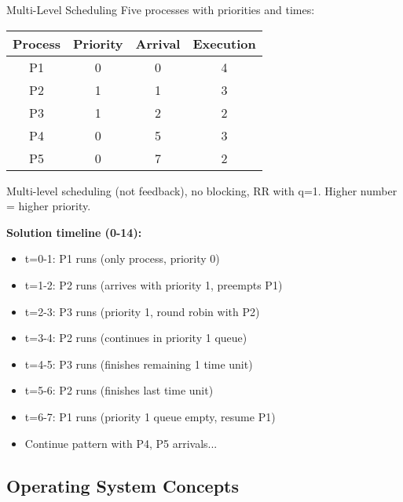 \begin{example2}{Multi-Level Scheduling}
    Five processes with priorities and times:
    
    \begin{tabular}{|c|c|c|c|}
        \hline
        Process & Priority & Arrival & Execution \\
        \hline
        P1 & 0 & 0 & 4 \\
        P2 & 1 & 1 & 3 \\
        P3 & 1 & 2 & 2 \\
        P4 & 0 & 5 & 3 \\
        P5 & 0 & 7 & 2 \\
        \hline
    \end{tabular}
    
    Multi-level scheduling (not feedback), no blocking, RR with q=1.
    Higher number = higher priority.
    
    \tcblower
    
    \textbf{Solution timeline (0-14):}
    \begin{itemize}
        \item t=0-1: P1 runs (only process, priority 0)
        \item t=1-2: P2 runs (arrives with priority 1, preempts P1)
        \item t=2-3: P3 runs (priority 1, round robin with P2)
        \item t=3-4: P2 runs (continues in priority 1 queue)
        \item t=4-5: P3 runs (finishes remaining 1 time unit)
        \item t=5-6: P2 runs (finishes last time unit)
        \item t=6-7: P1 runs (priority 1 queue empty, resume P1)
        \item Continue pattern with P4, P5 arrivals...
    \end{itemize}
\end{example2}

\raggedcolumns
\columnbreak

\subsection{Operating System Concepts}

